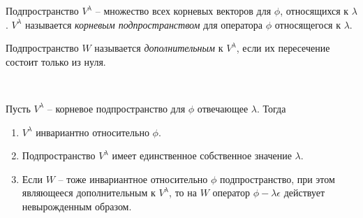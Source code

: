 \begin{definition}
    Подпространство $ V^{\lambda}$ -- множество всех корневых векторов для $\phi$, относящихся к $\lambda$. $ V^{\lambda}$ называется \textit{корневым подпространством} для оператора $\phi$ относящегося к $\lambda$.
\end{definition}

\begin{definition}
    Подпространство $W$ называется \textit{дополнительным} к $V^{\lambda}$, 
    если их пересечение состоит только из нуля.
\end{definition}

\begin{theorem}~
    \label{th5.1}

    Пусть $V^{\lambda}$ -- корневое подпространство для $\phi$ отвечающее $\lambda$. Тогда
    \begin{enumerate}
        \item $V^{\lambda}$ инвариантно относительно $\phi$.
        \item Подпространство $V^{\lambda}$ имеет единственное собственное значение $\lambda$.
        \item Если $W$ -- тоже инвариантное относительно $\phi$ подпространство, при этом являющееся 
        дополнительным к $V^{\lambda}$, то на $W$ оператор 
        $\phi - \lambda \epsilon$ действует невырожденным образом.
    \end{enumerate} 
\end{theorem}

